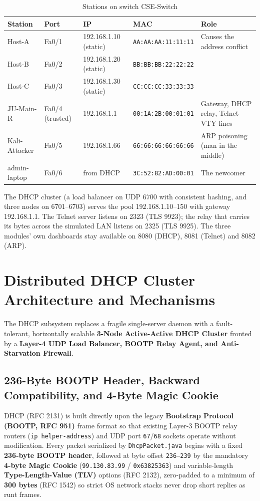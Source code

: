 \documentclass[11pt,a4paper]{article}
\begin{document}
\begin{table}[H]
\centering
\caption{Stations on switch CSE-Switch}
\small
\begin{tabularx}{\textwidth}{@{}llllY@{}}
\toprule
\textbf{Station} & \textbf{Port} & \textbf{IP} & \textbf{MAC} & \textbf{Role} \\ \midrule
Host-A & Fa0/1 & 192.168.1.10 (static) & \texttt{AA:AA:AA:11:11:11} & Causes the address conflict \\
Host-B & Fa0/2 & 192.168.1.20 (static) & \texttt{BB:BB:BB:22:22:22} & \\
Host-C & Fa0/3 & 192.168.1.30 (static) & \texttt{CC:CC:CC:33:33:33} & \\
JU-Main-R & Fa0/4 (trusted) & 192.168.1.1 & \texttt{00:1A:2B:00:01:01} & Gateway, DHCP relay, Telnet VTY lines \\
Kali-Attacker & Fa0/5 & 192.168.1.66 & \texttt{66:66:66:66:66:66} & ARP poisoning (man in the middle) \\
admin-laptop & Fa0/6 & from DHCP & \texttt{3C:52:82:AD:00:01} & The newcomer \\ \bottomrule
\end{tabularx}
\end{table}

\noindent The DHCP cluster (a load balancer on UDP 6700 with consistent hashing, and three nodes on 6701--6703) serves the pool 192.168.1.10--150 with gateway 192.168.1.1. The Telnet server listens on 2323 (TLS 9923); the relay that carries its bytes across the simulated LAN listens on 2325 (TLS 9925). The three modules' own dashboards stay available on 8080 (DHCP), 8081 (Telnet) and 8082 (ARP).

\section{Distributed DHCP Cluster Architecture and Mechanisms}
\label{sec:dhcp}

\noindent The DHCP subsystem replaces a fragile single-server daemon with a fault-tolerant, horizontally scalable \textbf{3-Node Active-Active DHCP Cluster} fronted by a \textbf{Layer-4 UDP Load Balancer, BOOTP Relay Agent, and Anti-Starvation Firewall}.

\subsection{236-Byte BOOTP Header, Backward Compatibility, and 4-Byte Magic Cookie}
DHCP (RFC 2131) is built directly upon the legacy \textbf{Bootstrap Protocol (BOOTP, RFC 951)} frame format so that existing Layer-3 BOOTP relay routers (\texttt{ip helper-address}) and UDP port \texttt{67}/\texttt{68} sockets operate without modification. Every packet serialized by \texttt{DhcpPacket.java} begins with a fixed \textbf{236-byte BOOTP header}, followed at byte offset \texttt{236--239} by the mandatory \textbf{4-byte Magic Cookie} (\texttt{99.130.83.99} / \texttt{0x63825363}) and variable-length \textbf{Type-Length-Value (TLV)} options (RFC 2132), zero-padded to a minimum of \textbf{300 bytes} (RFC 1542) so strict OS network stacks never drop short replies as runt frames.
\end{document}
